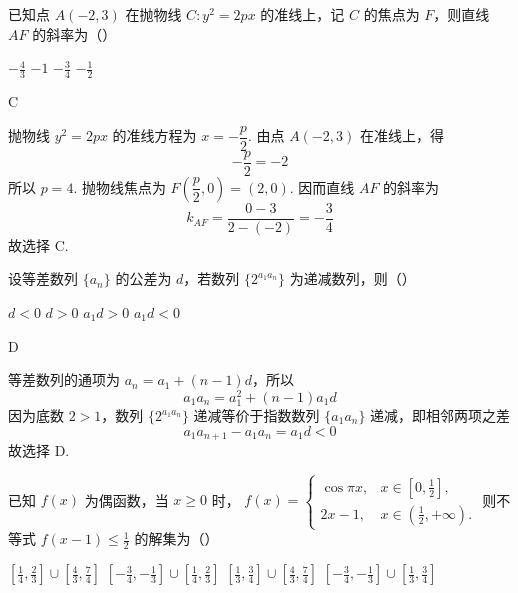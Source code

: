 \begin{problem}
已知点 \(A(-2,3)\) 在抛物线 \(C: y^{2} = 2px\) 的准线上，记 \(C\) 的焦点为 \(F\)，则直线 \(AF\) 的斜率为（\quad）

\choices
    {\(-\frac{4}{3}\)}
    {\(-1\)}
    {\(-\frac{3}{4}\)}
    {\(-\frac{1}{2}\)}
\end{problem}

\begin{answer}
C
\end{answer}

\begin{solution}
抛物线 \(y^{2}=2px\) 的准线方程为 \(x=-\dfrac{p}{2}\). 由点 \(A(-2,3)\) 在准线上，得
\[
-\frac{p}{2}=-2
\]
所以 \(p=4\). 抛物线焦点为 \(F\left(\dfrac{p}{2},0\right)=(2,0)\). 因而直线 \(AF\) 的斜率为
\[
k_{AF}=\frac{0-3}{2-(-2)}=-\frac{3}{4}
\]
故选择 C.
\end{solution}

\begin{problem}
设等差数列 \(\{a_{n}\}\) 的公差为 \(d\)，若数列 \(\{2^{a_{1}a_{n}}\}\) 为递减数列，则（\quad）

\choices
    {\(d < 0\)}
    {\(d > 0\)}
    {\(a_{1}d > 0\)}
    {\(a_{1}d < 0\)}
\end{problem}

\begin{answer}
D
\end{answer}

\begin{solution}
等差数列的通项为 \(a_n=a_1+(n-1)d\)，所以
\[
a_1a_n=a_1^{2}+(n-1)a_1d
\]
因为底数 \(2>1\)，数列 \(\{2^{a_1a_n}\}\) 递减等价于指数数列 \(\{a_1a_n\}\) 递减，即相邻两项之差
\[
a_1a_{n+1}-a_1a_n=a_1d<0
\]
故选择 D.
\end{solution}

\begin{problem}
已知 \( f(x) \) 为偶函数，当 \( x \geqslant 0 \) 时， \( f(x) = \begin{cases}
\cos \pi x, & x \in \left[0, \frac{1}{2}\right],\\
2x - 1, & x \in \left(\frac{1}{2}, +\infty\right).
\end{cases} \) 则不等式 \(f(x - 1)\leqslant \frac{1}{2}\) 的解集为（\quad）

\choices
    {\(\left[\frac{1}{4}, \frac{2}{3}\right] \cup \left[\frac{4}{3}, \frac{7}{4}\right]\)}
    {\(\left[-\frac{3}{4}, -\frac{1}{3}\right] \cup \left[\frac{1}{4}, \frac{2}{3}\right]\)}
    {\(\left[\frac{1}{3}, \frac{3}{4}\right] \cup \left[\frac{4}{3}, \frac{7}{4}\right]\)}
    {\(\left[-\frac{3}{4}, -\frac{1}{3}\right] \cup \left[\frac{1}{3}, \frac{3}{4}\right]\)}
\end{problem}

